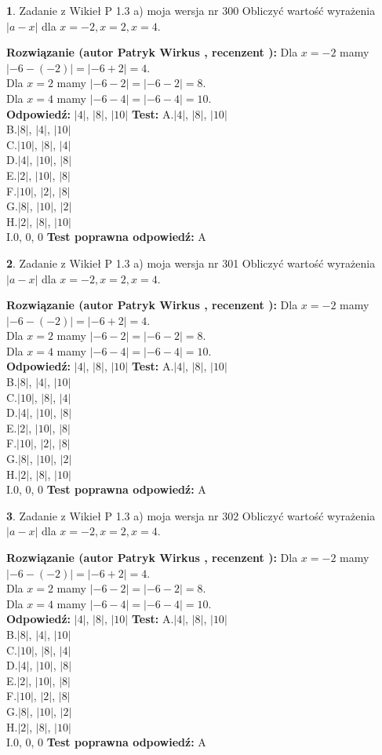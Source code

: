 \documentclass[12pt, a4paper]{article}
\theoremstyle{definition} %
\newtheorem{zad}{}
\newcommand{\zadStart}[1]{\begin{zad}#1\newline}
\newcommand{\zadStop}{\end{zad}}
\newcommand{\rozwStart}[2]{\noindent \textbf{Rozwiązanie (autor #1 , recenzent #2): }\newline}
\newcommand{\rozwStop}{\newline}
\newcommand{\odpStart}{\noindent \textbf{Odpowiedź:}\newline}
\newcommand{\odpStop}{\newline}
\newcommand{\testStart}{\noindent \textbf{Test:}\newline}
\newcommand{\testStop}{\newline}
\newcommand{\kluczStart}{\noindent \textbf{Test poprawna odpowiedź:}\newline}
\newcommand{\kluczStop}{\newline}
\begin{document}
\zadStart{Zadanie z Wikieł P 1.3 a) moja wersja nr 300}
Obliczyć wartość wyrażenia $|a - x|$ dla $x=-2,x=2,x=4$.
\zadStop
\rozwStart{Patryk Wirkus}{}
Dla $x = -2$ mamy $|-6 - (-2)| = |-6 + 2| = 4$.\\
Dla $x = 2$ mamy $|-6 - 2| = |-6 - 2| = 8$.\\
Dla $x = 4$ mamy $|-6 - 4| = |-6 - 4| = 10$.\\
\rozwStop
\odpStart
$|4|$, $|8|$, $|10|$
\odpStop
\testStart
A.$|4|$, $|8|$, $|10|$\\
B.$|8|$, $|4|$, $|10|$\\
C.$|10|$, $|8|$, $|4|$\\
D.$|4|$, $|10|$, $|8|$\\
E.$|2|$, $|10|$, $|8|$\\
F.$|10|$, $|2|$, $|8|$\\
G.$|8|$, $|10|$, $|2|$\\
H.$|2|$, $|8|$, $|10|$\\
I.$0$, $0$, $0$
\testStop
\kluczStart
A
\kluczStop



\zadStart{Zadanie z Wikieł P 1.3 a) moja wersja nr 301}
Obliczyć wartość wyrażenia $|a - x|$ dla $x=-2,x=2,x=4$.
\zadStop
\rozwStart{Patryk Wirkus}{}
Dla $x = -2$ mamy $|-6 - (-2)| = |-6 + 2| = 4$.\\
Dla $x = 2$ mamy $|-6 - 2| = |-6 - 2| = 8$.\\
Dla $x = 4$ mamy $|-6 - 4| = |-6 - 4| = 10$.\\
\rozwStop
\odpStart
$|4|$, $|8|$, $|10|$
\odpStop
\testStart
A.$|4|$, $|8|$, $|10|$\\
B.$|8|$, $|4|$, $|10|$\\
C.$|10|$, $|8|$, $|4|$\\
D.$|4|$, $|10|$, $|8|$\\
E.$|2|$, $|10|$, $|8|$\\
F.$|10|$, $|2|$, $|8|$\\
G.$|8|$, $|10|$, $|2|$\\
H.$|2|$, $|8|$, $|10|$\\
I.$0$, $0$, $0$
\testStop
\kluczStart
A
\kluczStop



\zadStart{Zadanie z Wikieł P 1.3 a) moja wersja nr 302}
Obliczyć wartość wyrażenia $|a - x|$ dla $x=-2,x=2,x=4$.
\zadStop
\rozwStart{Patryk Wirkus}{}
Dla $x = -2$ mamy $|-6 - (-2)| = |-6 + 2| = 4$.\\
Dla $x = 2$ mamy $|-6 - 2| = |-6 - 2| = 8$.\\
Dla $x = 4$ mamy $|-6 - 4| = |-6 - 4| = 10$.\\
\rozwStop
\odpStart
$|4|$, $|8|$, $|10|$
\odpStop
\testStart
A.$|4|$, $|8|$, $|10|$\\
B.$|8|$, $|4|$, $|10|$\\
C.$|10|$, $|8|$, $|4|$\\
D.$|4|$, $|10|$, $|8|$\\
E.$|2|$, $|10|$, $|8|$\\
F.$|10|$, $|2|$, $|8|$\\
G.$|8|$, $|10|$, $|2|$\\
H.$|2|$, $|8|$, $|10|$\\
I.$0$, $0$, $0$
\testStop
\kluczStart
A
\kluczStop
\end{document}

